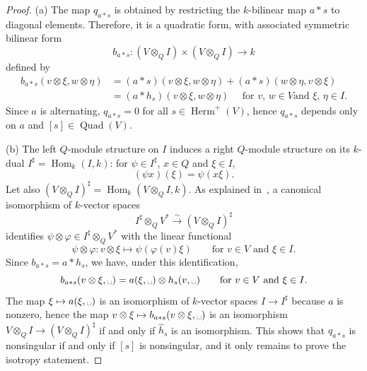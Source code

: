 \documentclass{amsart}
\DeclareMathOperator{\Quad}{Quad}
\DeclareMathOperator{\Herm}{Herm}
\DeclareMathOperator{\Hom}{Hom}
\theoremstyle{remark}
\begin{document}
\begin{proof}
(a) The map $q_{a*s}$ is obtained by restricting the $k$-bilinear map $a*s$ to diagonal elements. Therefore, it is a quadratic form, with associated symmetric bilinear form \[b_{a*s}\colon (V\otimes_QI) \times (V\otimes_QI)\to k\] defined by 
\begin{align*}
  b_{a*s}(v\otimes \xi, w\otimes\eta) &
        = (a*s)(v\otimes\xi, w\otimes\eta) + (a*s)(w\otimes\eta,
                                        v\otimes\xi)\\
                                      & = (a*h_s)(v\otimes\xi,w\otimes\eta)
                                        \quad\text{ for $v$, $w\in V$
                                        and $\xi$, $\eta\in I$.}
\end{align*}
Since $a$ is alternating, $q_{a*s}=0$ for all
$s\in\Herm^+(V)$, hence $q_{a*s}$ depends only on $a$ and
$[s]\in\Quad(V)$.

(b) The left $Q$-module structure on $I$ induces a right $Q$-module
  structure on its $k$-dual $I^\sharp = \Hom_k(I,k)$: for $\psi\in
  I^\sharp$, $x\in Q$ and $\xi\in I$,
  \[
    (\psi x)(\xi) = \psi(x\xi).
  \]
  Let also $(V\otimes_QI)^\sharp = \Hom_k(V\otimes_QI, k)$. As explained in~\cite[I(8.2.1)]{Knus}, 
a canonical isomorphism of $k$-vector spaces
  \begin{equation}
    \label{eq:isodual}
    I^\sharp\otimes_QV^* \xrightarrow{\sim} (V\otimes_QI)^\sharp
  \end{equation}
  identifies $\psi\otimes\varphi\in I^\sharp\otimes_QV^*$ with the
  linear functional
  \[
    \psi\otimes\varphi\colon v\otimes\xi \mapsto \psi(\varphi(v)\xi)
    \qquad\text{for $v\in V$ and $\xi\in I$.}
  \]
  Since $b_{a*s} = a*h_s$, we have, under this identification,
  \[
    b_{a*s}(v\otimes\xi,\mbox{\textvisiblespace}) = a(\xi,
    \mbox{\textvisiblespace}) \otimes h_s(v, \mbox{\textvisiblespace})
    \qquad\text{for $v\in V$ and $\xi\in I$.}
  \]
  The map $\xi\mapsto a(\xi,\mbox{\textvisiblespace})$ is an
  isomorphism of $k$-vector spaces $I\to I^\sharp$ because $a$ is
  nonzero, hence the map $v\otimes\xi\mapsto b_{a*s}(v\otimes\xi,
  \mbox{\textvisiblespace})$ is an isomorphism $V\otimes_QI \to
  (V\otimes_QI)^\sharp$ if and only if $\widehat h_s$ is an
  isomorphism. This shows that $q_{a*s}$ is nonsingular if and
  only if $[s]$ is nonsingular, and it only remains to prove the isotropy statement. 


\end{proof}
\end{document}
